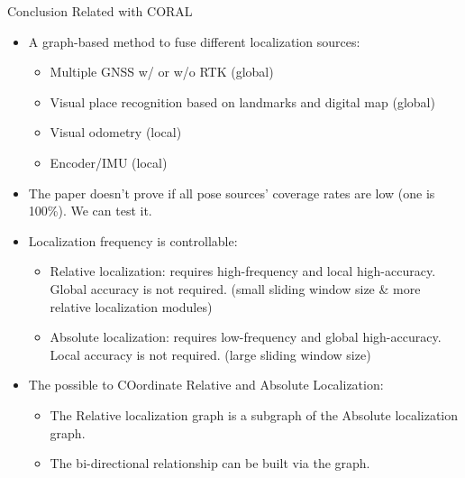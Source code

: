 \documentclass[10pt]{beamer}
\begin{document}
	\begin{frame}{Conclusion Related with CORAL}
		\begin{itemize}
			\item<1-> A graph-based method to fuse different localization sources:
			\begin{itemize}
				\item Multiple GNSS w/ or w/o RTK (global)
				\item Visual place recognition based on landmarks and digital map (global)
				\item Visual odometry (local)
				\item Encoder/IMU (local)
			\end{itemize}
			\item<2-> The paper doesn't prove if all pose sources' coverage rates are low (one is 100\%). We can test it.
			\item<3-> Localization frequency is controllable:
			\begin{itemize}
				\item Relative localization: requires high-frequency and local high-accuracy. Global accuracy is not required. (small sliding window size \& more relative localization modules)
				\item Absolute localization: requires low-frequency and global high-accuracy. Local accuracy is not required. (large sliding window size)
			\end{itemize}
			\item<4-> The possible to COordinate Relative and Absolute Localization:
			\begin{itemize}
				\item The Relative localization graph is a subgraph of the Absolute localization graph.
				\item The bi-directional relationship can be built via the graph.
			\end{itemize}
		\end{itemize}
	\end{frame}
\end{document}
